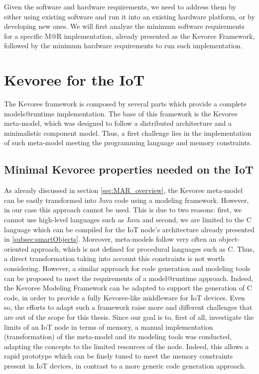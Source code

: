 Given the software and hardware requirements, we need to address them by either using existing software and run it into an existing hardware platform, or by developing new ones.
We will first analyze the minimum software requirements for a specific M@R implementation, already presented as the Kevoree Framework, followed by the minimum hardware requirements to run such implementation.

\section{Kevoree for the IoT}
\label{sec:kevAndIoT}
The Kevoree framework is composed by several parts which provide a complete models@runtime implementation.
The base of this framework is the Kevoree meta-model, which was designed to follow a distributed architecture and a minimalistic component model.
Thus, a first challenge lies in the implementation of such meta-model meeting the programming language and memory constraints.

\subsection{Minimal Kevoree properties needed on the IoT}
\label{subsec:minKevProp}
As already discussed in section \ref{sec:MAR_overview}, the Kevoree meta-model can be easily transformed into Java code using a modeling framework.
However, in our case this approach cannot be used.
This is due to two reasons: first, we cannot use high-level languages such as Java and second, we are limited to the C language which can be compiled for the IoT node's architecture already presented in \ref{subsec:smartObjects}.
Moreover, meta-models follow very often an object-oriented approach, which is not defined for procedural languages such as C.
Thus, a direct transformation taking into account this constraints is not worth considering.
However, a similar approach for code generation and modeling tools can be proposed to meet the requirements of a model@runtime approach.
Indeed, the Kevoree Modeling Framework\cite{fouquet2012eclipse} can be adapted to support the generation of C code, in order to provide a fully Kevoree-like middleware for IoT devices.
Even so, the efforts to adapt such a framework raise more and different challenges that are out of the scope for this thesis.
Since our goal is to, first of all, investigate the limits of an IoT node in terms of memory, a manual implementation (transformation) of the meta-model and its modeling tools was conducted, adapting the concepts to the limited resources of the node.
Indeed, this allows a rapid prototype which can be finely tuned to meet the memory constraints present in IoT devices, in contrast to a more generic code generation approach.

